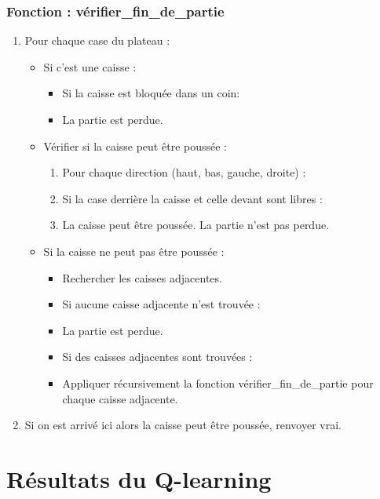 \documentclass[
	11pt, %
]{beamer}
\begin{document}
\begin{frame}
    \frametitle{Fonction : vérifier\_fin\_de\_partie}
    
    \begin{enumerate}
        \item Pour chaque case du plateau :
        \begin{itemize}
            \item Si c'est une caisse :
            \begin{itemize}
                \item Si la caisse est bloquée dans un coin:
                \item La partie est perdue.
            \end{itemize}
            \item Vérifier si la caisse peut être poussée :
            \begin{enumerate}
                \item Pour chaque direction (haut, bas, gauche, droite) :
                \item Si la case derrière la caisse et celle devant sont libres :
                \item La caisse peut être poussée. La partie n'est pas perdue.
            \end{enumerate}
            \item Si la caisse ne peut pas être poussée :
            \begin{itemize}
                \item Rechercher les caisses adjacentes.
                \item Si aucune caisse adjacente n'est trouvée :
                \item La partie est perdue.
                \item Si des caisses adjacentes sont trouvées :
                \item Appliquer récursivement la fonction vérifier\_fin\_de\_partie pour chaque caisse adjacente.
            \end{itemize}
        \end{itemize}
        \item Si on est arrivé ici alors la caisse peut être poussée, renvoyer vrai.
    \end{enumerate}
\end{frame}

\section{Résultats du Q-learning}
\end{document}
